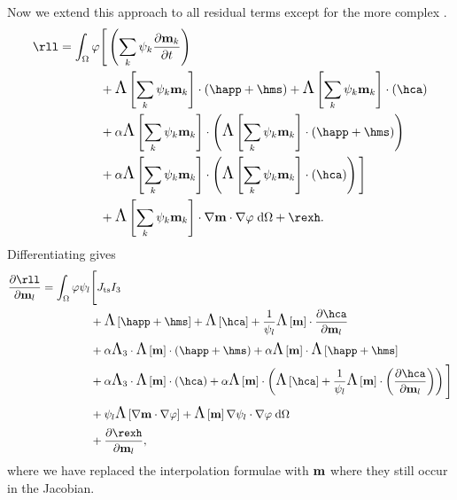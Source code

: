 Now we extend this approach to all residual terms except for the more complex .
\begin{equation}
  \begin{aligned}
    \rll = \int_\magd \tbf &\Bigg[ \left( \sum_\ibasisc \sk \pd{\mv_\ibasisc}{t} \right)
      \\
      & + \crossop{\intp{\mv}}{\happ + \hms} + \crossop{\intp{\mv}}{\hca}
      \\
      &+ \dampc \crossop{\intp{\mv}}{\crossop{\intp{\mv}}{\happ + \hms}}
      \\
      &+ \dampc \crossop{\intp{\mv}}{\crossop{\intp{\mv}}{\hca}} \Bigg] \\
    &+ \skewm{\intp{\mv}} \cdot \nabla \mv \cdot \nabla \tbf \d\magd
    + \rexh.
  \end{aligned}
\end{equation}
Differentiating gives
\begin{equation}
  \begin{aligned}
    \pd{\rll}{\mv_l} =  \int_\magd \tbf \sbf_l &\Bigg[
      \dtsdml I_3
      \\
      &+ \skewm{\happ + \hms} + \skewm{\hca} + \frac{1}{\sbf_l} \skewm{\mv} \cdot \pd{\hca}{\mv_l}
      \\
      &+ \dampc \skewop_3 \cdot \crossop{\mv}{\happ + \hms}
      + \dampc \skewm{\mv} \cdot \skewm{\happ + \hms}
      \\
      &+ \dampc \skewop_3 \cdot \crossop{\mv}{\hca}
      + \dampc \crossop{\mv}{\skewm{\hca} + \frac{1}{\sbf_l}\crossop{\mv}{\pd{\hca}{\mv_l}}}
      \Bigg]
    \\
    &+ \sbf_l \skewm{\nabla \mv \cdot \nabla \tbf}
    + \skewm{\mv} \nabla \sbf_l \cdot \nabla \tbf \d\magd
    \\
    &+ \pd{\rexh}{\mv_l},
  \end{aligned}
\end{equation}
where we have replaced the interpolation formulae with $\mathbf{m}$ where they still occur in the Jacobian.


